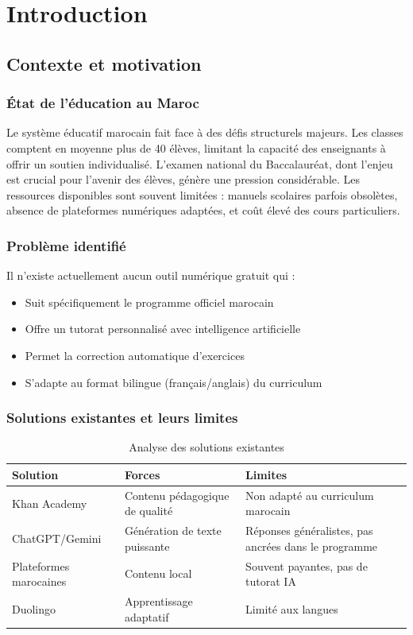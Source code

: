 \documentclass[12pt,a4paper]{report}
\begin{document}
\chapter{Introduction}

\section{Contexte et motivation}

\subsection{État de l'éducation au Maroc}
Le système éducatif marocain fait face à des défis structurels majeurs. Les classes comptent en moyenne plus de 40 élèves, limitant la capacité des enseignants à offrir un soutien individualisé. L'examen national du Baccalauréat, dont l'enjeu est crucial pour l'avenir des élèves, génère une pression considérable. Les ressources disponibles sont souvent limitées : manuels scolaires parfois obsolètes, absence de plateformes numériques adaptées, et coût élevé des cours particuliers.

\subsection{Problème identifié}
Il n'existe actuellement aucun outil numérique gratuit qui :
\begin{itemize}
    \item Suit spécifiquement le programme officiel marocain
    \item Offre un tutorat personnalisé avec intelligence artificielle
    \item Permet la correction automatique d'exercices
    \item S'adapte au format bilingue (français/anglais) du curriculum
\end{itemize}

\subsection{Solutions existantes et leurs limites}
\begin{table}[h!]
    \centering
    \begin{tabular}{p{4cm} p{5cm} p{5cm}}
        \toprule
        \textbf{Solution} & \textbf{Forces} & \textbf{Limites} \\
        \midrule
        Khan Academy & Contenu pédagogique de qualité & Non adapté au curriculum marocain \\
        ChatGPT/Gemini & Génération de texte puissante & Réponses généralistes, pas ancrées dans le programme \\
        Plateformes marocaines & Contenu local & Souvent payantes, pas de tutorat IA \\
        Duolingo & Apprentissage adaptatif & Limité aux langues \\
        \bottomrule
    \end{tabular}
    \caption{Analyse des solutions existantes}
\end{table}
\end{document}

